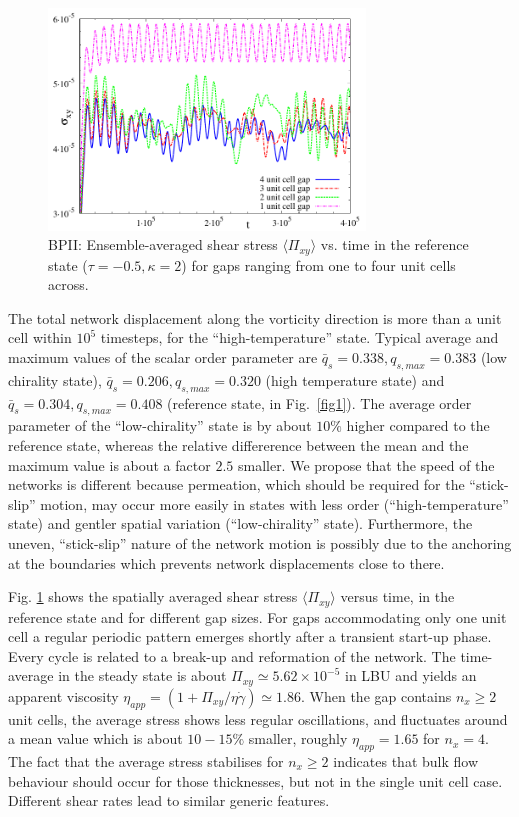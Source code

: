 \documentclass[12pt,twoside]{iopart}
\newcommand{\ex}[1]{\times10^{#1}}
\begin{document}
\begin{figure}[t]
\centering
\includegraphics[width=0.75\textwidth]{stress_bp2_fbc.pdf}
\caption{BPII: Ensemble-averaged shear stress $\langle \Pi_{xy}\rangle$ vs. time in the reference state ($\tau=-0.5, \kappa=2$) for gaps ranging from one to four unit cells across.}
\label{fig3}
\end{figure}

The total network displacement along the vorticity direction is more than a unit cell within $10^5$ timesteps, for the ``high-temperature'' state.
Typical average and maximum values of the scalar order parameter are $\bar{q}_s=0.338, q_{s,max}=0.383$ (low chirality state), 
$\bar{q}_s=0.206, q_{s,max}=0.320$ (high temperature state) and $\bar{q}_s=0.304, q_{s,max}=0.408$ (reference state, in Fig.~\ref{fig1}).
The average order parameter of the ``low-chirality'' state is by about $10\%$ higher compared to the reference state, 
whereas the relative differerence between the mean and the maximum value is about a factor $2.5$ smaller.
We propose that the speed of the networks is different because permeation, which should be required for the ``stick-slip'' motion, may occur more easily in states with less order (``high-temperature'' state) and gentler spatial variation (``low-chirality'' state). Furthermore, the uneven, ``stick-slip'' nature of the network motion is possibly due to the anchoring at the boundaries which prevents network displacements close to there. 

Fig. \ref{fig3} shows the spatially averaged shear stress $\langle \Pi_{xy}\rangle$ versus time, in the reference state and for different gap sizes.
For gaps accommodating only one unit cell a regular periodic pattern emerges shortly after a transient start-up phase.
Every cycle is related to a break-up and reformation of the network.
The time-average in the steady state is about $\Pi_{xy}\simeq5.62\ex{-5}$ in LBU and yields an apparent viscosity $\eta_{app}=(1 +\Pi_{xy}/\eta\dot{\gamma})\simeq 1.86$. 
When the gap contains $n_x\ge2$ unit cells, the average stress shows less regular oscillations, and fluctuates around a mean value which is about $10-15\%$ smaller, roughly $\eta_{app}=1.65$ for $n_x=4$. The fact that the average stress stabilises for $n_x\ge2$ indicates that bulk flow behaviour should occur for those thicknesses, but not in the single unit cell case.
Different shear rates lead to similar generic features.
\end{document}

